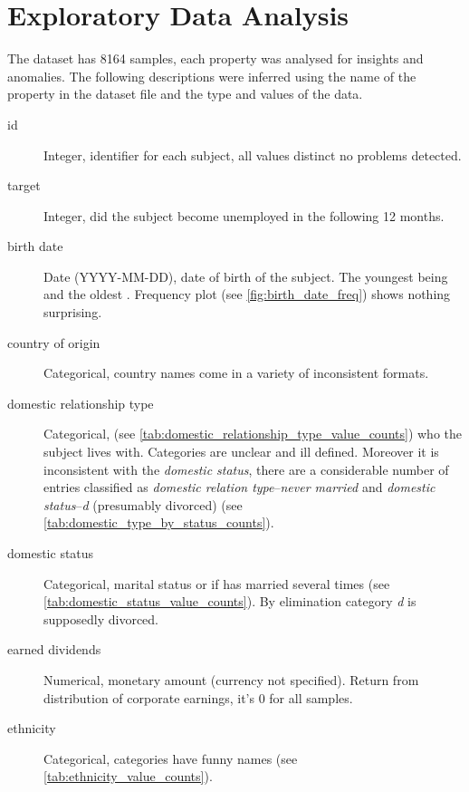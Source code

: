 \section{Exploratory Data Analysis}
\label{sec:eda}

The dataset has 8164 samples, each property was analysed for insights and
anomalies.
The following descriptions were inferred using the name of the property in the
dataset file and the type and values of the data.

\begin{description}
\item [id] Integer, identifier for each subject, all values distinct no
    problems detected.

\item [target] Integer, did the subject become unemployed in the following
    12 months.

\item [birth date] Date (YYYY-MM-DD), date of birth of the subject.
    The youngest being  and the oldest
    .
    Frequency plot (see \vref{fig:birth_date_freq}) shows nothing surprising.

\item [country of origin] Categorical, country names come in a variety of
    inconsistent formats.

\item [domestic relationship type] Categorical,
    (see \vref{tab:domestic_relationship_type_value_counts}) who the subject
    lives with.
    Categories are unclear and ill defined.
    Moreover it is inconsistent with the \emph{domestic status}, there are a
    considerable number of entries classified as
    \emph{domestic relation type}--\emph{never married} and
    \emph{domestic status}--\emph{d} (presumably divorced)
    (see \vref{tab:domestic_type_by_status_counts}).

\item [domestic status] Categorical, marital status or if has married several
    times (see \vref{tab:domestic_status_value_counts}).
    By elimination category \emph{d} is supposedly divorced.

\item [earned dividends] Numerical, monetary amount (currency not specified).
    Return from distribution of corporate earnings, it's 0 for all samples.

\item [ethnicity] Categorical, categories have funny names
    (see \vref{tab:ethnicity_value_counts}).


\end{description}

